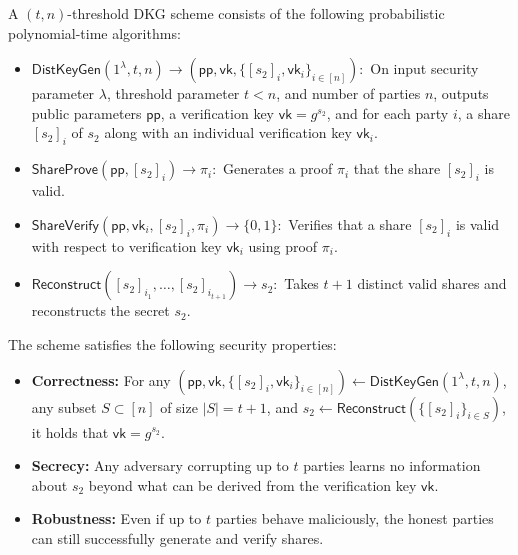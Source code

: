 \begin{definition} 
A $(t,n)$-threshold DKG scheme consists of the following probabilistic polynomial-time algorithms:

\begin{itemize} 
\item $\mathsf{DistKeyGen}(1^{\lambda}, t, n) \to (\mathsf{pp}, \mathsf{vk}, \{[s_2]_i, \mathsf{vk}_i\}_{i \in [n]}):$ On input security parameter $\lambda$, threshold parameter $t < n$, and number of parties $n$, outputs public parameters $\mathsf{pp}$, a verification key $\mathsf{vk} = g^{s_2}$, and for each party $i$, a share $[s_2]_i$ of $s_2$ along with an individual verification key $\mathsf{vk}_i$.

\item $\mathsf{ShareProve}(\mathsf{pp}, [s_2]_i) \to \pi_i:$ Generates a proof $\pi_i$ that the share $[s_2]_i$ is valid.

\item $\mathsf{ShareVerify}(\mathsf{pp}, \mathsf{vk}_i, [s_2]_i, \pi_i) \to \{0,1\}:$ Verifies that a share $[s_2]_i$ is valid with respect to verification key $\mathsf{vk}_i$ using proof $\pi_i$.

\item $\mathsf{Reconstruct}([s_2]_{i_1}, \dots, [s_2]_{i_{t+1}}) \to s_2:$ Takes $t+1$ distinct valid shares and reconstructs the secret $s_2$.
\end{itemize}

The scheme satisfies the following security properties:

\begin{itemize}
\item \textbf{Correctness:} For any $(\mathsf{pp}, \mathsf{vk}, \{[s_2]_i, \mathsf{vk}_i\}_{i \in [n]}) \leftarrow \mathsf{DistKeyGen}(1^{\lambda}, t, n)$, any subset $S \subset [n]$ of size $|S| = t+1$, and $s_2 \leftarrow \mathsf{Reconstruct}(\{[s_2]_i\}_{i \in S})$, it holds that $\mathsf{vk} = g^{s_2}$.

\item \textbf{Secrecy:} Any adversary corrupting up to $t$ parties learns no information about $s_2$ beyond what can be derived from the verification key $\mathsf{vk}$.

\item \textbf{Robustness:} Even if up to $t$ parties behave maliciously, the honest parties can still successfully generate and verify shares.
\end{itemize}
\end{definition}



